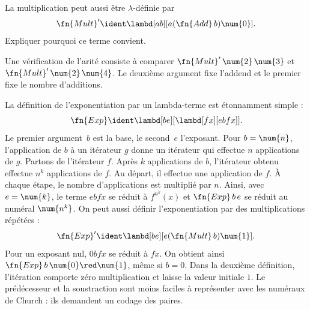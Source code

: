 \documentclass[../../../include/open-logic-section]{subfiles}
\begin{document}
\begin{prob}
La multiplication peut aussi être
$\lambda$-définie par
\[
  \fn{Mult}' \ident
  \lambd[ab][a (\fn{Add}\, b) \num{0}].
\]
Expliquer pourquoi ce terme convient.
\end{prob}

Une vérification de l'arité consiste à comparer
$\fn{Mult}'\,\num{2}\,\num{3}$ et
$\fn{Mult}'\,\num{2}\,\num{4}$.
Le deuxième argument fixe l'addend et le premier
fixe le nombre d'additions.

La définition de l'exponentiation par
un lambda-terme est étonnamment simple :
\[
  \fn{Exp} \ident \lambd[be][\lambd[fx][e b f x]].
\]
Le premier argument~$b$ est la base, le second~$e$ l'exposant.
Pour $b=\num{n}$, l'application de $b$ à un itérateur $g$
donne un itérateur qui effectue $n$ applications de $g$.
Partons de l'itérateur $f$. Après $k$ applications de $b$,
l'itérateur obtenu effectue $n^k$ applications de $f$.
Au départ, il effectue une application de $f$. À chaque étape,
le nombre d'applications est multiplié par $n$.
Ainsi, avec $e=\num{k}$, le terme $e b f x$ se réduit
à $f^{n^k}(x)$ et $\fn{Exp}\,b\,e$ se réduit au numéral
$\num{n^k}$. On peut aussi définir l'exponentiation
par des multiplications répétées :
\[
  \fn{Exp}' \ident
  \lambd[be][e (\fn{Mult}\, b) \num{1}].
\]
Pour un exposant nul, $\num{0}bfx$ se réduit à $fx$.
On obtient ainsi $\fn{Exp}\,b\,\num{0}\red\num{1}$,
même si $b=\num{0}$. Dans la deuxième définition,
l'itération comporte zéro multiplication et laisse
la valeur initiale $\num{1}$.
Le prédécesseur et la soustraction sont
moins faciles à représenter avec les
numéraux de Church : ils demandent un
codage des paires.
\end{document}
